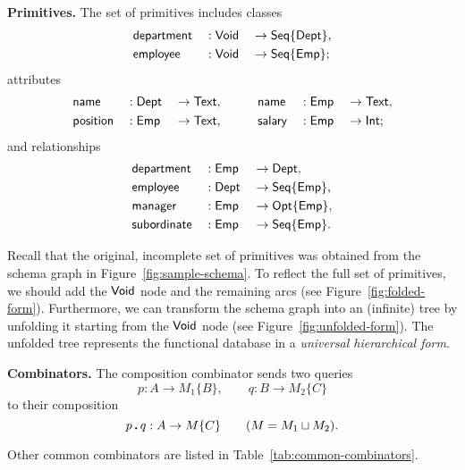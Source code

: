 \textbf{Primitives.} The set of primitives includes classes
\begin{alignat*}{3}
    & \mathsf{department} && : \mathsf{Void} && \to \mathsf{Seq}{\left\{\mathsf{Dept}\right\}}, \\
    & \mathsf{employee} && : \mathsf{Void} && \to \mathsf{Seq}{\left\{\mathsf{Emp}\right\}};
\end{alignat*}
attributes
\begin{alignat*}{6}
    & \mathsf{name} && : \mathsf{Dept} && \to \mathsf{Text}, \qquad
    && \mathsf{name} && : \mathsf{Emp} && \to \mathsf{Text}, \\
    & \mathsf{position} && : \mathsf{Emp} && \to \mathsf{Text}, \qquad
    && \mathsf{salary} && : \mathsf{Emp} && \to \mathsf{Int};
\end{alignat*}
and relationships
\begin{alignat*}{3}
    & \mathsf{department} && : \mathsf{Emp} && \to \mathsf{Dept}, \\
    & \mathsf{employee} && : \mathsf{Dept} && \to \mathsf{Seq}{\left\{\mathsf{Emp}\right\}}, \\
    & \mathsf{manager} && : \mathsf{Emp} && \to \mathsf{Opt}{\left\{\mathsf{Emp}\right\}}, \\
    & \mathsf{subordinate} && : \mathsf{Emp} && \to \mathsf{Seq}{\left\{\mathsf{Emp}\right\}}.
\end{alignat*}

Recall that the original, incomplete set of primitives was obtained from the
schema graph in Figure~\ref{fig:sample-schema}.  To reflect the full set of
primitives, we should add the $\mathsf{Void}$ node and the remaining arcs (see
Figure~\ref{fig:folded-form}).  Furthermore, we can transform the schema graph
into an (infinite) tree by unfolding it starting from the $\mathsf{Void}$ node (see
Figure~\ref{fig:unfolded-form}).  The unfolded tree represents the functional
database in a \emph{universal hierarchical form}.

\textbf{Combinators.} The composition combinator sends two queries
\begin{equation*}
    p : A \to M_1\{B\}, \qquad
    q : B \to M_2\{C\}
\end{equation*}
to their composition
\begin{equation*}
    p\,\boldsymbol{.}\,q : A \to M\{C\} \qquad (M = M_1 \sqcup M_2).
\end{equation*}

Other common combinators are listed in Table~\ref{tab:common-combinators}.




